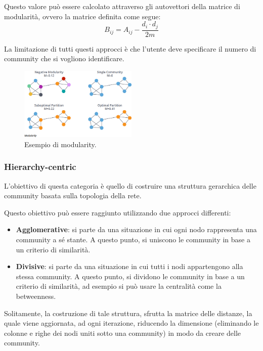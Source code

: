 Questo valore può essere calcolato attraverso gli autovettori della matrice di
modularità, ovvero la matrice definita come segue:
\begin{equation}
    B_{ij} = A_{ij} - \frac{d_i \cdot d_j}{2m}
\end{equation}
\begin{nota}
    La limitazione di tutti questi approcci è che l'utente deve specificare il
    numero di community che si vogliono identificare.
\end{nota}
\begin{figure}[!ht]
    \centering
    \includegraphics[width=0.5\textwidth]{./img/net/modularity.png}
    \caption{Esempio di modularity.}
    \label{fig:modularity}
\end{figure}
\subsubsection{Hierarchy-centric}
L'obiettivo di questa categoria è quello di costruire una struttura gerarchica
delle community basata sulla topologia della rete.

Questo obiettivo può essere raggiunto utilizzando due approcci differenti:
\begin{itemize}
    \item \textbf{Agglomerative}: si parte da una situazione in cui ogni nodo
          rappresenta una community a sé stante. A questo punto, si uniscono
          le community in base a un criterio di similarità.
    \item \textbf{Divisive}: si parte da una situazione in cui tutti i nodi
          appartengono alla stessa community. A questo punto, si dividono le
          community in base a un criterio di similarità, ad esempio si può usare la centralità come 
          la betweenness.
\end{itemize}
Solitamente, la costruzione di tale struttura, sfrutta la matrice delle distanze,
la quale viene aggiornata, ad ogni iterazione, riducendo la dimensione (eliminando
le colonne e righe dei nodi uniti sotto una community) in modo da creare delle
community.

